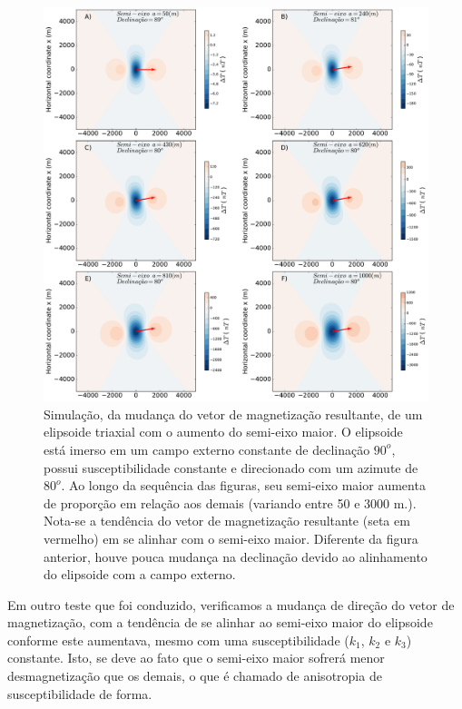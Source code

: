 \begin{figure}[hbt!]
	\centering \includegraphics[width=16 cm,height=16 cm]{figures/ellipsoid_shape_iso2}
	\caption[Simulação, da mudança do vetor de magnetização resultante, de um elipsoide triaxial com o aumento do semi-eixo maior.]{Simulação, da mudança do vetor de magnetização resultante, de um elipsoide triaxial com o aumento do semi-eixo maior. O elipsoide está imerso em um campo externo constante de declinação $90^o$, possui susceptibilidade constante e direcionado com um azimute de $80^o$. Ao longo da sequência das figuras, seu semi-eixo maior aumenta de proporção em relação aos demais (variando entre 50 e 3000 m.). Nota-se a tendência do vetor de magnetização resultante (seta em vermelho) em se alinhar com o semi-eixo maior. Diferente da figura anterior, houve pouca mudança na declinação devido ao alinhamento do elipsoide com a campo externo.}
	\label{fig:ellipsoid_shape_iso80}
\end{figure}


Em outro teste que foi conduzido, verificamos a mudança de direção do vetor de magnetização, com a tendência de se alinhar ao semi-eixo maior do elipsoide conforme este aumentava, mesmo com uma susceptibilidade ($k_1$, $k_2$ e $k_3$) constante. Isto, se deve ao fato que o semi-eixo maior sofrerá menor desmagnetização que os demais, o que é chamado de anisotropia de susceptibilidade de forma.
